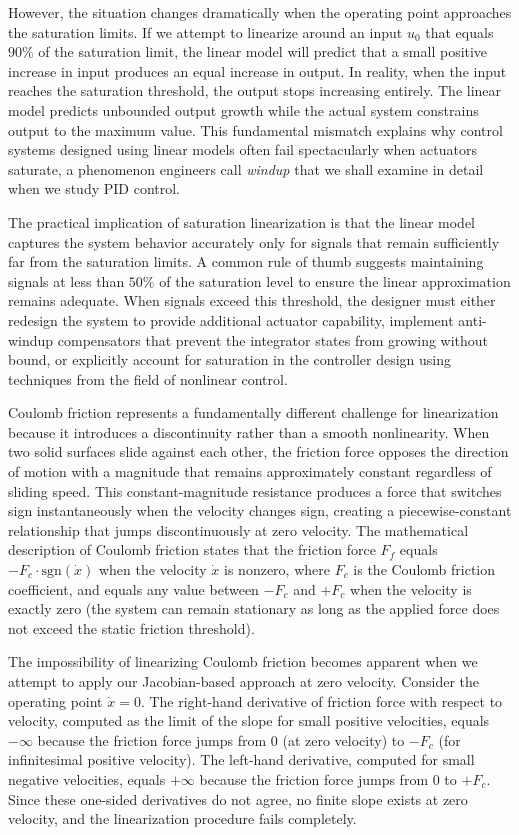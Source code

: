 However, the situation changes dramatically when the operating point approaches the saturation limits. If we attempt to linearize around an input $u_0$ that equals $90\%$ of the saturation limit, the linear model will predict that a small positive increase in input produces an equal increase in output. In reality, when the input reaches the saturation threshold, the output stops increasing entirely. The linear model predicts unbounded output growth while the actual system constrains output to the maximum value. This fundamental mismatch explains why control systems designed using linear models often fail spectacularly when actuators saturate, a phenomenon engineers call \textit{windup} that we shall examine in detail when we study PID control.

The practical implication of saturation linearization is that the linear model captures the system behavior accurately only for signals that remain sufficiently far from the saturation limits. A common rule of thumb suggests maintaining signals at less than $50\%$ of the saturation level to ensure the linear approximation remains adequate. When signals exceed this threshold, the designer must either redesign the system to provide additional actuator capability, implement anti-windup compensators that prevent the integrator states from growing without bound, or explicitly account for saturation in the controller design using techniques from the field of nonlinear control.

Coulomb friction represents a fundamentally different challenge for linearization because it introduces a discontinuity rather than a smooth nonlinearity. When two solid surfaces slide against each other, the friction force opposes the direction of motion with a magnitude that remains approximately constant regardless of sliding speed. This constant-magnitude resistance produces a force that switches sign instantaneously when the velocity changes sign, creating a piecewise-constant relationship that jumps discontinuously at zero velocity. The mathematical description of Coulomb friction states that the friction force $F_f$ equals $-F_c \cdot \text{sgn}(\dot{x})$ when the velocity $\dot{x}$ is nonzero, where $F_c$ is the Coulomb friction coefficient, and equals any value between $-F_c$ and $+F_c$ when the velocity is exactly zero (the system can remain stationary as long as the applied force does not exceed the static friction threshold).

The impossibility of linearizing Coulomb friction becomes apparent when we attempt to apply our Jacobian-based approach at zero velocity. Consider the operating point $\dot{x} = 0$. The right-hand derivative of friction force with respect to velocity, computed as the limit of the slope for small positive velocities, equals $-\infty$ because the friction force jumps from $0$ (at zero velocity) to $-F_c$ (for infinitesimal positive velocity). The left-hand derivative, computed for small negative velocities, equals $+\infty$ because the friction force jumps from $0$ to $+F_c$. Since these one-sided derivatives do not agree, no finite slope exists at zero velocity, and the linearization procedure fails completely.

